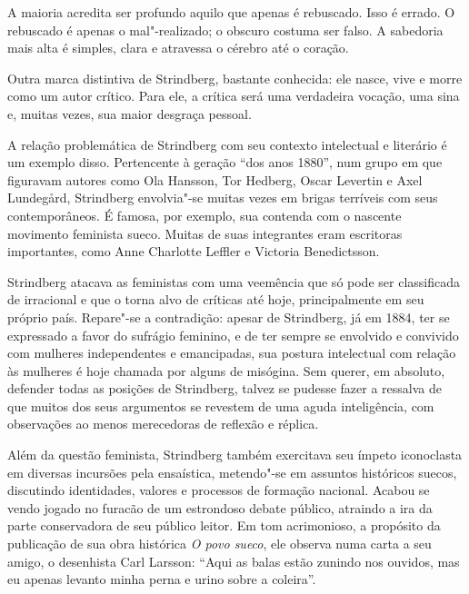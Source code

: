 \begin{hedraquote}
A maioria acredita ser profundo aquilo que apenas é rebuscado. Isso é
errado. O rebuscado é apenas o mal"-realizado; o obscuro costuma ser
falso. A sabedoria mais alta é simples, clara e atravessa o cérebro até
o coração.
\end{hedraquote}


Outra marca distintiva de Strindberg, bastante conhecida: ele
nasce, vive e morre como um autor crítico. Para ele, a crítica será uma
verdadeira vocação, uma sina e, muitas vezes, sua maior desgraça pessoal. 

A relação problemática de Strindberg com seu contexto intelectual e
literário é um exemplo disso. Pertencente à geração “dos anos 1880”, 
num grupo em que figuravam autores como Ola Hansson, Tor Hedberg,
Oscar Levertin e Axel Lundegård, Strindberg envolvia"-se muitas vezes em
brigas terríveis com seus contemporâneos. É famosa, por exemplo, sua
contenda com o nascente movimento feminista sueco. Muitas de suas
integrantes eram escritoras importantes, como Anne Charlotte
Leffler e Victoria Benedictsson. 

Strindberg atacava as feministas com
uma veemência que só pode ser classificada de irracional e que o torna alvo de 
críticas até hoje, principalmente em seu próprio país. Repare"-se a contradição: apesar de
Strindberg, já em 1884, ter se expressado a favor do sufrágio feminino, e de ter sempre 
se envolvido e convivido com mulheres independentes e emancipadas, 
sua postura intelectual com relação às mulheres é
hoje chamada por alguns de misógina. Sem querer,
em absoluto, defender todas as posições de Strindberg, talvez se pudesse fazer a
ressalva de que muitos dos seus argumentos se revestem de uma aguda inteligência,
com observações ao menos merecedoras de reflexão e réplica.

Além da questão feminista, Strindberg também exercitava seu ímpeto 
iconoclasta em diversas incursões pela ensaística, metendo"-se em assuntos
históricos suecos, discutindo identidades, valores e processos de
formação nacional. Acabou se vendo jogado no furacão de um estrondoso debate
público, atraindo a ira da parte conservadora de seu público leitor. Em
tom acrimonioso, a propósito da publicação de sua obra histórica
\textit{O povo sueco}, ele observa numa carta a seu amigo, o
desenhista Carl Larsson: “Aqui as balas estão zunindo nos
ouvidos, mas eu apenas levanto minha perna e urino sobre a coleira”. 

